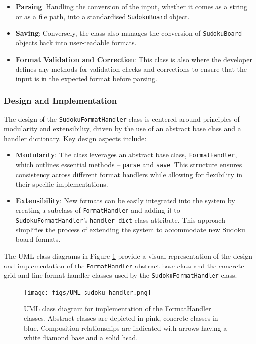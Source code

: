 \documentclass[11pt]{article}
\begin{document}
\begin{itemize}
\item \textbf{Parsing}: Handling the conversion of the input, whether it comes as a string or as a file path, into a standardised \texttt{SudokuBoard} object.

\item \textbf{Saving}: Conversely, the class also manages the conversion of \texttt{SudokuBoard} objects back into user-readable formats. 

\item \textbf{Format Validation and Correction}: This class is also where the developer defines any methods for validation checks and corrections to ensure that the input is in the expected format before parsing.
\end{itemize}

\subsubsection{Design and Implementation}
The design of the \texttt{SudokuFormatHandler} class is centered around principles of modularity and extensibility, driven by the use of an abstract base class and a handler dictionary. Key design aspects include:

\begin{itemize}
    \item \textbf{Modularity}: The class leverages an abstract base class, \texttt{FormatHandler}, which outlines essential methods -- \texttt{parse} and \texttt{save}. This structure ensures consistency across different format handlers while allowing for flexibility in their specific implementations.
    \item \textbf{Extensibility}: New formats can be easily integrated into the system by creating a subclass of \texttt{FormatHandler} and adding it to \texttt{SudokuFormatHandler}'s \texttt{handler\_dict} class attribute. This approach simplifies the process of extending the system to accommodate new Sudoku board formats.
\end{itemize}
The UML class diagrams in Figure \ref{fig:format_handler_uml} provide a visual representation of the design and implementation of the \texttt{FormatHandler} abstract base class and the concrete grid and line format handler classes used by the \texttt{SudokuFormatHandler} class.
\begin{figure}[H]
    \centering
    \texttt{[image: figs/UML\_sudoku\_handler.png]}
    \caption{UML class diagram for implementation of the FormatHandler classes. Abstract classes are depicted in pink, concrete classes in blue. Composition relationships are indicated with arrows having a white diamond base and a solid head.}
    \label{fig:format_handler_uml}
\end{figure}
\end{document}
